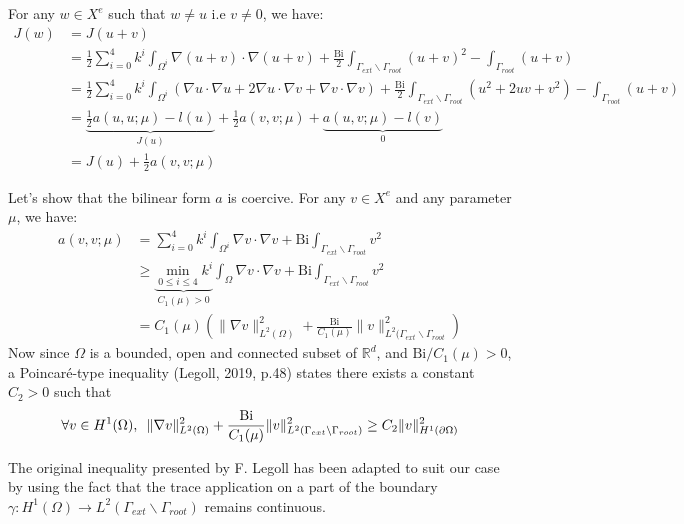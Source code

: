 \documentclass[
	english,
	11pt, %
]{fphw}
\newcommand{\hquad}{\hspace{0.5em}} %
\newcommand{\bi}{\text{Bi}}
\begin{document}
\noindent For any $w \in X^e$ such that $w \neq u$ i.e $v \neq 0$, we have:
\begin{align*}	
J(w) &= J(u+v) \\
&= \frac{1}{2} \sum_{i=0}^4 k^i \int_{\Omega^i} \nabla (u+v) \cdot \nabla (u+v) + \frac{\bi}{2} \int_{\Gamma_{ext} \backslash \Gamma_{root}} (u+v)^2 -\int_{\Gamma_{root}} (u+v) \\ 
&= \frac{1}{2} \sum_{i=0}^4 k^i \int_{\Omega^i} \left( \nabla u \cdot \nabla u + 2 \nabla u \cdot \nabla v + \nabla v \cdot \nabla v\right) + \frac{\bi}{2} \int_{\Gamma_{ext} \backslash \Gamma_{root}} \left( u^2 +2uv+v^2 \right) -\int_{\Gamma_{root}} \left(u + v\right) \\
&= \underbrace{\frac{1}{2}a(u,u; \mu) - l(u)}_{J(u)} + \frac{1}{2}a(v,v;\mu) + \underbrace{a(u,v;\mu)- l(v)}_{0} \\
&= J(u) + \frac{1}{2}a(v,v;\mu) \tag{$\ast$} \label{j}
\end{align*}

Let's show that the bilinear form $a$ is coercive. For any $v \in X^e$ and any parameter $\mu$, we have:
\begin{align*}
	a(v,v;\mu) &= \sum_{i=0}^4 k^i \int_{\Omega^i} \nabla v \cdot \nabla v + \bi \int_{\Gamma_{ext} \backslash \Gamma_{root}} v^2 \\
	&\geq \underbrace{\min_{0\leq i \leq 4} k^i}_{C_1(\mu) > 0} \int_{\Omega} \nabla v \cdot \nabla v + \bi \int_{\Gamma_{ext} \backslash \Gamma_{root}} v^2  \\
	&= C_1(\mu) \left( \lVert \nabla v \rVert_{L^2(\Omega)}^2 +  \frac{\bi}{C_1(\mu)} \lVert v \rVert_{L^2(\Gamma_{ext} \backslash \Gamma_{root}}^2  \right)  \tag{$\ast \ast$} \label{coercivity}
\end{align*}
Now since $\Omega$ is a bounded, open and connected subset of $\mathbb{R}^d$, and $\bi / C_1(\mu) > 0$, a Poincaré-type inequality (Legoll, 2019, p.48) states there exists a constant $C_2 > 0$ such that 
\begin{align*}  \label{poincare}
\forall v \in H^1(\Omega), \hquad \lVert \nabla v \rVert_{L^2(\Omega)}^2 +  \frac{\bi}{C_1(\mu)} \lVert v \rVert_{L^2(\Gamma_{ext} \backslash \Gamma_{root})}^2 \geq C_2 \lVert v \rVert_{H^1(\partial \Omega)}^2
\end{align*} 

\noindent The original inequality presented by F. Legoll has been adapted to suit our case by using the fact that the trace application on a part of the boundary  $\gamma : H^1(\Omega) \rightarrow L^2(\Gamma_{ext} \backslash \Gamma_{root})$ remains continuous.
\end{document}
